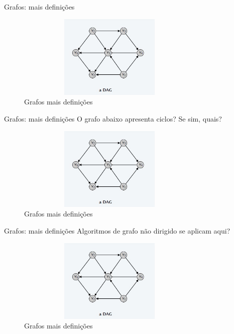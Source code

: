 \begin{frame}
	\begin{block}{Grafos: mais definições}
		\begin{figure}[!htb]
			\centering	  
			\includegraphics[height=4cm, width = 9cm]{./pic/DAGSemCiclo.jpg}
			\caption{Grafos mais definições}
		\end{figure}
	\end{block}
\end{frame}

\begin{frame}
	\begin{block}{Grafos: mais definições}
		O grafo abaixo apresenta ciclos? Se sim, quais? 
		\begin{figure}[!htb]
			\centering	  
			\includegraphics[height=4cm, width = 9cm]{./pic/DAGSemCiclo.jpg}
			\caption{Grafos mais definições}
		\end{figure}
	\end{block}
\end{frame}

\begin{frame}
	\begin{block}{Grafos: mais definições}
		Algoritmos de grafo não dirigido se aplicam aqui?
		\begin{figure}[!htb]
			\centering	  
			\includegraphics[height=4cm, width = 9cm]{./pic/DAGSemCiclo.jpg}
			\caption{Grafos mais definições}
		\end{figure}
	\end{block}
\end{frame}

